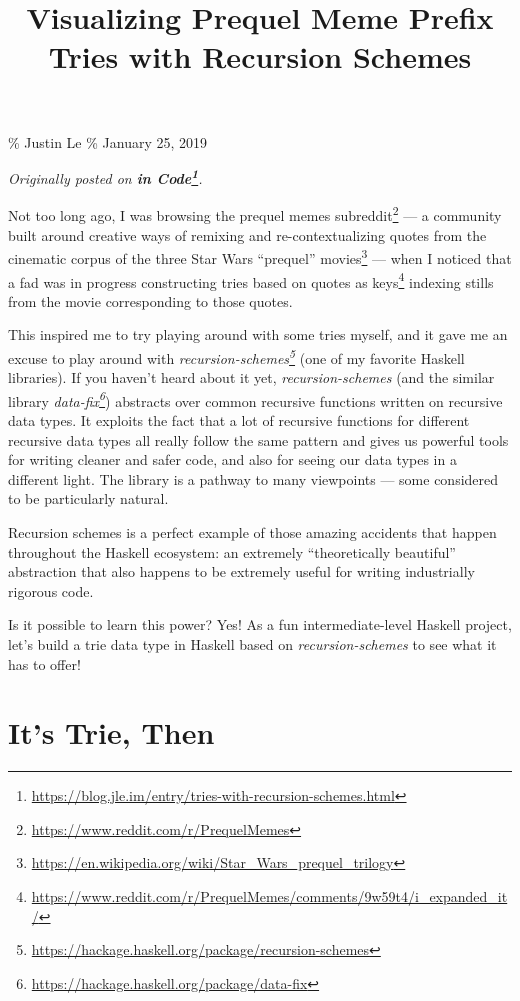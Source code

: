 \documentclass[]{article}
\title{Visualizing Prequel Meme Prefix Tries with Recursion Schemes}
\renewcommand{\href}[2]{#2\footnote{\url{#1}}}
\begin{document}
\maketitle

\% Justin Le \% January 25, 2019

\emph{Originally posted on
\textbf{\href{https://blog.jle.im/entry/tries-with-recursion-schemes.html}{in
Code}}.}

Not too long ago, I was browsing the
\href{https://www.reddit.com/r/PrequelMemes}{prequel memes subreddit} --- a
community built around creative ways of remixing and re-contextualizing quotes
from the cinematic corpus of the three
\href{https://en.wikipedia.org/wiki/Star_Wars_prequel_trilogy}{Star Wars
``prequel'' movies} --- when I noticed that a fad was in progress
\href{https://www.reddit.com/r/PrequelMemes/comments/9w59t4/i_expanded_it/}{constructing
tries based on quotes as keys} indexing stills from the movie corresponding to
those quotes.

This inspired me to try playing around with some tries myself, and it gave me an
excuse to play around with
\emph{\href{https://hackage.haskell.org/package/recursion-schemes}{recursion-schemes}}
(one of my favorite Haskell libraries). If you haven't heard about it yet,
\emph{recursion-schemes} (and the similar library
\emph{\href{https://hackage.haskell.org/package/data-fix}{data-fix}}) abstracts
over common recursive functions written on recursive data types. It exploits the
fact that a lot of recursive functions for different recursive data types all
really follow the same pattern and gives us powerful tools for writing cleaner
and safer code, and also for seeing our data types in a different light. The
library is a pathway to many viewpoints --- some considered to be particularly
natural.

Recursion schemes is a perfect example of those amazing accidents that happen
throughout the Haskell ecosystem: an extremely ``theoretically beautiful''
abstraction that also happens to be extremely useful for writing industrially
rigorous code.

Is it possible to learn this power? Yes! As a fun intermediate-level Haskell
project, let's build a trie data type in Haskell based on
\emph{recursion-schemes} to see what it has to offer!

\section{It's Trie, Then}\label{its-trie-then}
\end{document}
